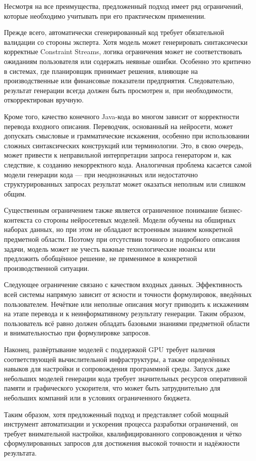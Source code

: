 Несмотря на все преимущества, предложенный подход имеет ряд ограничений, которые необходимо учитывать при его практическом применении.

Прежде всего, автоматически сгенерированный код требует обязательной валидации со стороны эксперта. Хотя модель может генерировать синтаксически корректные Constraint Streams, логика ограничения может не соответствовать ожиданиям пользователя или содержать неявные ошибки. Особенно это критично в системах, где планировщик принимает решения, влияющие на производственные или финансовые показатели предприятия. Следовательно, результат генерации всегда должен быть просмотрен и, при необходимости, откорректирован вручную.

Кроме того, качество конечного Java-кода во многом зависит от корректности перевода входного описания. Переводчик, основанный на нейросети, может допускать смысловые и грамматические искажения, особенно при использовании сложных синтаксических конструкций или терминологии. Это, в свою очередь, может привести к неправильной интерпретации запроса генератором и, как следствие, к созданию некорректного кода. Аналогичная проблема касается самой модели генерации кода — при неоднозначных или недостаточно структурированных запросах результат может оказаться неполным или слишком общим.

Существенным ограничением также является ограниченное понимание бизнес-контекста со стороны нейросетевых моделей. Модели обучены на обширных наборах данных, но при этом не обладают встроенным знанием конкретной предметной области. Поэтому при отсутствии точного и подробного описания задачи, модель может не учесть важные технологические нюансы или предложить обобщённое решение, не применимое в конкретной производственной ситуации.

Следующее ограничение связано с качеством входных данных. Эффективность всей системы напрямую зависит от ясности и точности формулировок, введённых пользователем. Нечёткие или неполные описания могут приводить к искажениям на этапе перевода и к неинформативному результату генерации. Таким образом, пользователь всё равно должен обладать базовыми знаниями предметной области и внимательностью при формулировке запросов.

Наконец, развёртывание моделей с поддержкой GPU требует наличия соответствующей вычислительной инфраструктуры, а также определённых навыков для настройки и сопровождения программной среды. Запуск даже небольших моделей генерации кода требует значительных ресурсов оперативной памяти и графического ускорителя, что может быть затруднительно для небольших компаний или в условиях ограниченного бюджета.

Таким образом, хотя предложенный подход и представляет собой мощный инструмент автоматизации и ускорения процесса разработки ограничений, он требует внимательной настройки, квалифицированного сопровождения и чётко сформулированных запросов для достижения высокой точности и надёжности результата.



